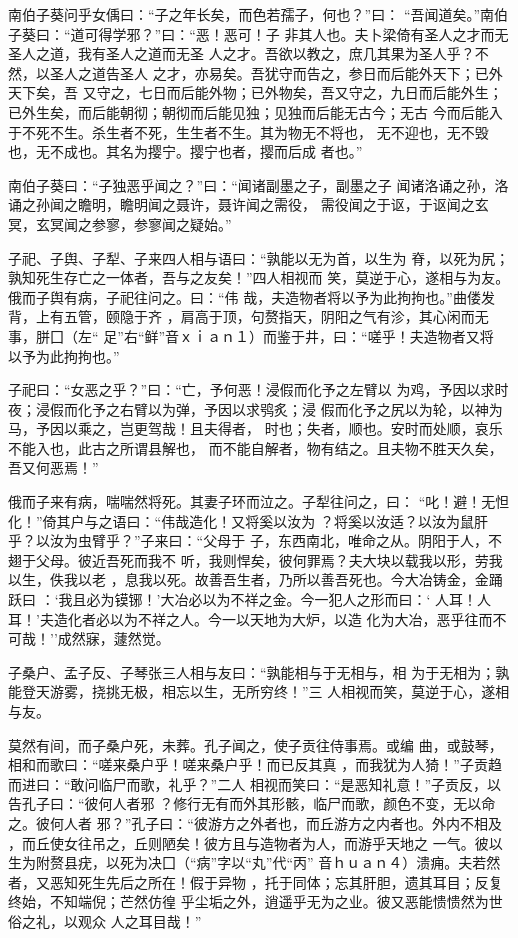 \documentclass[]{article}
\begin{document}
南伯子葵问乎女偊曰：``子之年长矣，而色若孺子，何也？''曰：
``吾闻道矣。''南伯子葵曰：``道可得学邪？''曰：``恶！恶可！子
非其人也。夫卜梁倚有圣人之才而无圣人之道，我有圣人之道而无圣
人之才。吾欲以教之，庶几其果为圣人乎？不然，以圣人之道告圣人
之才，亦易矣。吾犹守而告之，参日而后能外天下；已外天下矣，吾
又守之，七日而后能外物；已外物矣，吾又守之，九日而后能外生；
已外生矣，而后能朝彻；朝彻而后能见独；见独而后能无古今；无古
今而后能入于不死不生。杀生者不死，生生者不生。其为物无不将也，
无不迎也，无不毁也，无不成也。其名为撄宁。撄宁也者，撄而后成 者也。''

南伯子葵曰：``子独恶乎闻之？''曰：``闻诸副墨之子，副墨之子
闻诸洛诵之孙，洛诵之孙闻之瞻明，瞻明闻之聂许，聂许闻之需役，
需役闻之于讴，于讴闻之玄冥，玄冥闻之参寥，参寥闻之疑始。''

子祀、子舆、子犁、子来四人相与语曰：``孰能以无为首，以生为
脊，以死为尻；孰知死生存亡之一体者，吾与之友矣！''四人相视而
笑，莫逆于心，遂相与为友。俄而子舆有病，子祀往问之。曰：``伟
哉，夫造物者将以予为此拘拘也。''曲偻发背，上有五管，颐隐于齐
，肩高于顶，句赘指天，阴阳之气有沴，其心闲而无事，胼囗（左``
足''右``鲜''音ｘｉａｎ１）而鉴于井，曰：``嗟乎！夫造物者又将
以予为此拘拘也。''

子祀曰：``女恶之乎？''曰：``亡，予何恶！浸假而化予之左臂以
为鸡，予因以求时夜；浸假而化予之右臂以为弹，予因以求鸮炙；浸
假而化予之尻以为轮，以神为马，予因以乘之，岂更驾哉！且夫得者，
时也；失者，顺也。安时而处顺，哀乐不能入也，此古之所谓县解也，
而不能自解者，物有结之。且夫物不胜天久矣，吾又何恶焉！''

俄而子来有病，喘喘然将死。其妻子环而泣之。子犁往问之，曰：
``叱！避！无怛化！''倚其户与之语曰：``伟哉造化！又将奚以汝为
？将奚以汝适？以汝为鼠肝乎？以汝为虫臂乎？''子来曰：``父母于
子，东西南北，唯命之从。阴阳于人，不翅于父母。彼近吾死而我不
听，我则悍矣，彼何罪焉？夫大块以载我以形，劳我以生，佚我以老
，息我以死。故善吾生者，乃所以善吾死也。今大冶铸金，金踊跃曰
：`我且必为镆铘！'大冶必以为不祥之金。今一犯人之形而曰：`
人耳！人耳！'夫造化者必以为不祥之人。今一以天地为大炉，以造
化为大冶，恶乎往而不可哉！''成然寐，蘧然觉。

子桑户、孟子反、子琴张三人相与友曰：``孰能相与于无相与，相
为于无相为；孰能登天游雾，挠挑无极，相忘以生，无所穷终！''三
人相视而笑，莫逆于心，遂相与友。

莫然有间，而子桑户死，未葬。孔子闻之，使子贡往侍事焉。或编
曲，或鼓琴，相和而歌曰：``嗟来桑户乎！嗟来桑户乎！而已反其真
，而我犹为人猗！''子贡趋而进曰：``敢问临尸而歌，礼乎？''二人
相视而笑曰：``是恶知礼意！''子贡反，以告孔子曰：``彼何人者邪
？修行无有而外其形骸，临尸而歌，颜色不变，无以命之。彼何人者
邪？''孔子曰：``彼游方之外者也，而丘游方之内者也。外内不相及
，而丘使女往吊之，丘则陋矣！彼方且与造物者为人，而游乎天地之
一气。彼以生为附赘县疣，以死为决囗（``病''字以``丸''代``丙''
音ｈｕａｎ４）溃痈。夫若然者，又恶知死生先后之所在！假于异物
，托于同体；忘其肝胆，遗其耳目；反复终始，不知端倪；芒然仿徨
乎尘垢之外，逍遥乎无为之业。彼又恶能愦愦然为世俗之礼，以观众
人之耳目哉！''
\end{document}
